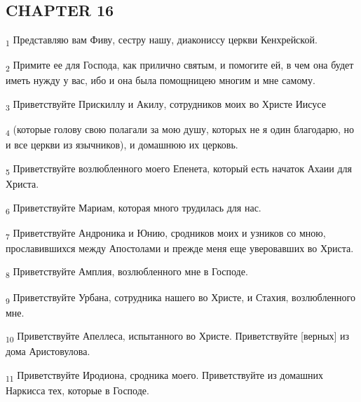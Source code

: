 \subsection{CHAPTER 16}
\begin{tcolorbox}
\textsubscript{1} Представляю вам Фиву, сестру нашу, диакониссу церкви Кенхрейской.
\end{tcolorbox}
\begin{tcolorbox}
\textsubscript{2} Примите ее для Господа, как прилично святым, и помогите ей, в чем она будет иметь нужду у вас, ибо и она была помощницею многим и мне самому.
\end{tcolorbox}
\begin{tcolorbox}
\textsubscript{3} Приветствуйте Прискиллу и Акилу, сотрудников моих во Христе Иисусе
\end{tcolorbox}
\begin{tcolorbox}
\textsubscript{4} (которые голову свою полагали за мою душу, которых не я один благодарю, но и все церкви из язычников), и домашнюю их церковь.
\end{tcolorbox}
\begin{tcolorbox}
\textsubscript{5} Приветствуйте возлюбленного моего Епенета, который есть начаток Ахаии для Христа.
\end{tcolorbox}
\begin{tcolorbox}
\textsubscript{6} Приветствуйте Мариам, которая много трудилась для нас.
\end{tcolorbox}
\begin{tcolorbox}
\textsubscript{7} Приветствуйте Андроника и Юнию, сродников моих и узников со мною, прославившихся между Апостолами и прежде меня еще уверовавших во Христа.
\end{tcolorbox}
\begin{tcolorbox}
\textsubscript{8} Приветствуйте Амплия, возлюбленного мне в Господе.
\end{tcolorbox}
\begin{tcolorbox}
\textsubscript{9} Приветствуйте Урбана, сотрудника нашего во Христе, и Стахия, возлюбленного мне.
\end{tcolorbox}
\begin{tcolorbox}
\textsubscript{10} Приветствуйте Апеллеса, испытанного во Христе. Приветствуйте [верных] из дома Аристовулова.
\end{tcolorbox}
\begin{tcolorbox}
\textsubscript{11} Приветствуйте Иродиона, сродника моего. Приветствуйте из домашних Наркисса тех, которые в Господе.
\end{tcolorbox}
